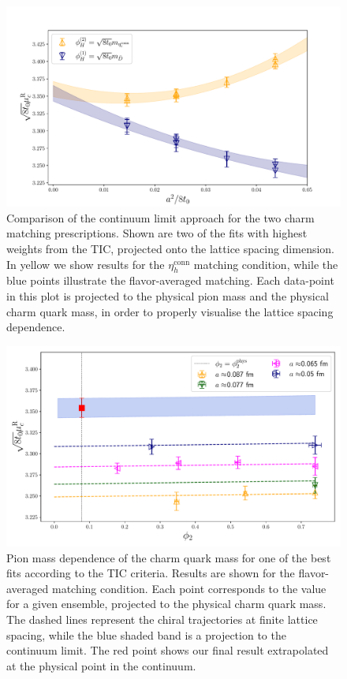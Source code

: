 \begin{figure}
	\centering 
	\includegraphics[scale=0.45]{./cap6/figs/mc/mc_cl_all_cat.pdf}
	\caption{Comparison of the continuum limit approach for the two  charm matching 
	prescriptions. Shown are two of the fits with highest weights from the TIC, projected onto the lattice 
	spacing dimension. In yellow we show results for the $\eta_h^{\mathrm{conn}}$ matching condition, while  the blue 
	points illustrate  the flavor-averaged matching. Each data-point in this plot is projected to the 
	physical pion mass and the physical charm quark mass, in order to properly visualise the lattice 
	spacing dependence. }
	\label{fig:mc_continuum_limit}
\end{figure}

\begin{figure}
	\centering
	\includegraphics[scale=0.42]{./cap6/figs/mc/fit_phi2_muc_fl_ave.pdf}
	\caption{Pion mass dependence of the charm quark mass for one of the best  fits according to the TIC criteria. Results are shown for the flavor-averaged matching condition. Each point corresponds to the  value for a given ensemble, projected to the physical charm quark mass. The dashed lines represent the chiral trajectories at finite lattice spacing, while the blue shaded band is a projection to the continuum limit. The red point shows our final result extrapolated at the physical point in the continuum. }
	\label{fig:mc_pion_dependence}
\end{figure}

